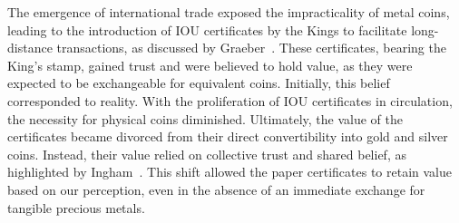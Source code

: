 The emergence of international trade exposed the impracticality of metal coins, leading to the introduction of IOU certificates by the Kings to
facilitate long-distance transactions, as discussed by Graeber~\cite{graeber2011}. These certificates, bearing the King's stamp, gained trust
and were believed to hold value, as they were expected to be exchangeable for equivalent coins. Initially, this belief corresponded to reality.
With the proliferation of IOU certificates in circulation, the necessity for physical coins diminished. Ultimately, the value of the certificates
became divorced from their direct convertibility into gold and silver coins. Instead, their value relied on collective trust and shared belief,
as highlighted by Ingham~\cite{ingham2004}. This shift allowed the paper certificates to retain value based on our perception, even in the
absence of an immediate exchange for tangible precious metals.
